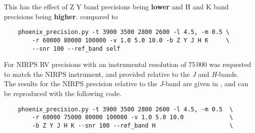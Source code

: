 This has the effect of Z Y band precisions being \textbf{lower} and H and K band precisions being\textbf{ higher}. compared to 


\begin{lstlisting}
    phoenix_precision.py -t 3900 3500 2800 2600 -l 4.5, -m 0.5 \
        -r 60000 80000 100000 -v 1.0 5.0 10.0 -b Z Y J H K     \
        --snr 100 --ref_band self
\end{lstlisting}


For {NIRPS} RV precisions with an instrumental resolution of 75\,000 was requested to match the NIRPS instrument, and provided relative to the \emph{J} and \emph{H}-bands. The results for the NIRPS precision relative to the \emph{J}-band are given in , and can be reproduced with the following code.

\begin{lstlisting}
    phoenix_precision.py -t 3900 3500 2800 2600 -l 4.5, -m 0.5  \ 
        -r 60000 75000 80000 100000 -v 1.0 5.0 10.0             \
        -b Z Y J H K --snr 100 --ref_band H                     \
\end{lstlisting}







